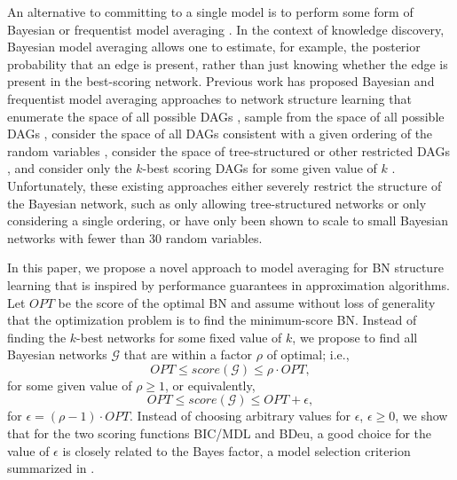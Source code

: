 \documentclass[letterpaper]{article}
\newcommand{\opt}{\mathit{OPT}}
\newcommand{\cost}{\mathit{score}}
\begin{document}
An alternative to committing to a single model is to
perform some form of Bayesian or frequentist model averaging
\cite{Claeskens2008,HoetingMRV1999,KollerF09}.
In the context of knowledge discovery, Bayesian model averaging
allows one to estimate, for example, the posterior probability
that an edge is present, rather than just knowing whether the
edge is present in the best-scoring network.
Previous work has proposed
Bayesian and frequentist model averaging approaches to network structure
learning that enumerate the space of all possible DAGs \cite{KoivistoS04}, sample from the space of all
possible DAGs \cite{HeTW2016,MadiganR1994}, consider
the space of all DAGs consistent with a given ordering of
the random variables \cite{Buntine91,DashC2004},
consider the space of tree-structured or other restricted
DAGs \cite{MadiganR1994,Meila2000}, and consider
only the $k$-best scoring DAGs for some given value of $k$
\cite{ChenCD2015,ChenCD2016,chen2018pruning,ChenT2014,HeTW2016,TianHR10}.
Unfortunately, these existing approaches either severely
restrict the structure of the Bayesian network, such as
only allowing tree-structured networks or only considering a
single ordering, or have only been shown to scale to small
Bayesian networks with fewer than 30 random variables.

In this paper, we propose a novel approach to
model averaging for BN structure learning that is inspired
by performance guarantees in approximation algorithms. Let
$\opt$ be the score of the optimal BN and assume
without loss of generality that the optimization problem
is to find the minimum-score BN.
Instead of
finding the $k$-best networks for some fixed value of $k$,
we propose to find all Bayesian networks $\mathcal{G}$ that
are within a factor $\rho$ of optimal; i.e.,
\begin{equation}
\label{EQUATION:factor}
\opt \le \cost(\mathcal{G}) \le \rho \cdot \opt,
\end{equation}
for some given value of $\rho \ge 1$, or equivalently,
\begin{equation}
\label{EQUATION:factor_add}
\opt \le \cost(\mathcal{G}) \le \opt+\epsilon,
\end{equation}
for $\epsilon = (\rho - 1) \cdot \opt$. Instead of choosing arbitrary
values for $\epsilon$, $\epsilon \ge 0$, we show that for the
two scoring functions BIC/MDL and BDeu, a good choice for the value of $\epsilon$ is
closely related to the Bayes factor, a model selection criterion
summarized in \cite{kass1995bayes}.
\end{document}
